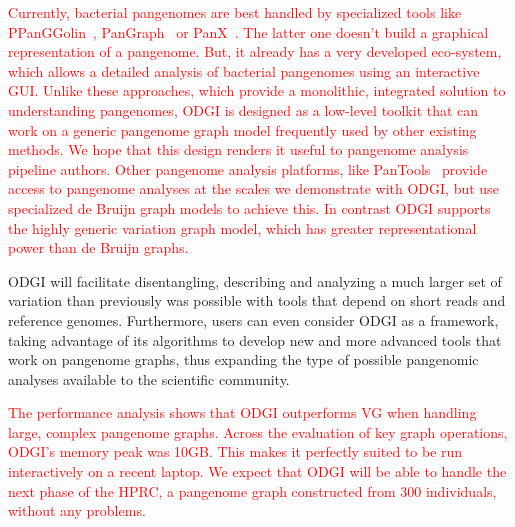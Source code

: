 \documentclass{bioinfo}
\newcommand{\REVIEWED}[1]{{\textcolor{Red}{#1}}}
\begin{document}
\REVIEWED{Currently, bacterial pangenomes are best handled by specialized tools like PPanGGolin~\citep{Gautreau2020}, PanGraph~\citep{Noll2022} or PanX~\citep{Wei2017}. The latter one doesn't build a graphical representation of  a pangenome. But, it already has a very developed eco-system, which allows a detailed analysis of bacterial pangenomes using an interactive GUI.
Unlike these approaches, which provide a monolithic, integrated solution to understanding pangenomes, ODGI is designed as a low-level toolkit that can work on a generic pangenome graph model frequently used by other existing methods.
We hope that this design renders it useful to pangenome analysis pipeline authors.
Other pangenome analysis platforms, like PanTools~\citep{Sheikhizadeh_2016} provide access to pangenome analyses at the scales we demonstrate with ODGI, but use specialized de Bruijn graph models to achieve this. In contrast ODGI supports the highly generic variation graph model, which has greater representational power than de Bruijn graphs.}

ODGI will facilitate disentangling,
describing and analyzing a much larger set of variation than previously was possible with tools that depend on short reads and reference genomes.
Furthermore, users can even consider ODGI as a framework, taking advantage of its algorithms to develop new and more advanced tools that work on pangenome graphs,
thus expanding the type of possible pangenomic analyses available to the scientific community.

\REVIEWED{The performance analysis shows that ODGI outperforms VG when handling large, complex pangenome graphs.
Across the evaluation of key graph operations, ODGI's memory peak was 10GB. This makes it perfectly suited to be run interactively on a recent laptop.
We expect that ODGI will be able to handle the next phase of the HPRC, a pangenome graph constructed from 300 individuals, without any problems.}
\end{document}
